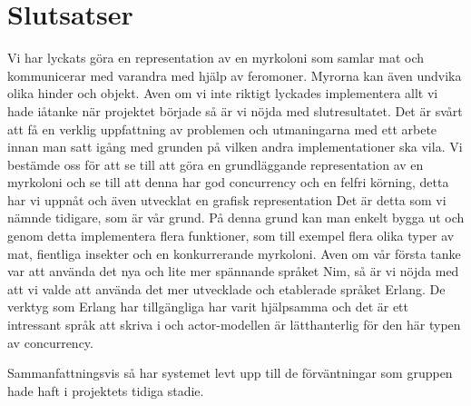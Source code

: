 \documentclass[12pt]{article}
\begin{document}
\section{Slutsatser}
Vi har lyckats göra en representation av en myrkoloni som samlar mat och kommunicerar med varandra med hjälp av feromoner.
Myrorna kan även undvika olika hinder och objekt.
Aven om vi inte riktigt lyckades implementera allt vi hade iåtanke när projektet
började så är vi nöjda med slutresultatet.
Det är svårt att få en verklig uppfattning av problemen och utmaningarna med ett arbete innan man satt igång med grunden på vilken andra implementationer ska vila.
Vi bestämde oss för att se till att göra en grundläggande representation av en myrkoloni och se till att denna har god concurrency och en felfri körning,
detta har vi uppnåt och även utvecklat en grafisk representation Det är detta som vi nämnde tidigare,
som är vår grund.
På denna grund kan man enkelt bygga ut och genom detta implementera flera funktioner,
som till exempel flera olika typer av mat,
fientliga insekter och en konkurrerande myrkoloni.
Aven om vår första
tanke var att använda det nya och lite mer spännande språket Nim,
så är vi nöjda med att vi valde att använda det mer utvecklade och etablerade språket Erlang.
De verktyg som Erlang har tillgängliga har varit hjälpsamma och det är ett intressant språk att skriva i och actor-modellen är lätthanterlig för den här typen av concurrency.

Sammanfattningsvis så har systemet levt upp till de förväntningar som gruppen hade haft i projektets tidiga stadie.



\end{document}
